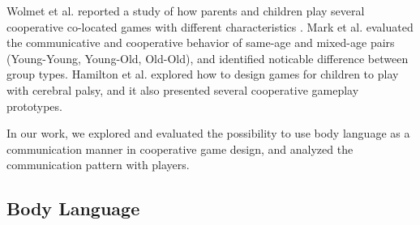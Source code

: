 Wolmet et al. reported a study of how parents and children play several cooperative co-located games with different characteristics \cite{CG5}. 
Mark et al. \cite{CG6} evaluated the communicative and cooperative behavior of same-age and mixed-age pairs (Young-Young, Young-Old, Old-Old), and identified noticable difference between group types. 
Hamilton et al. \cite{CG7} explored how to design games for children to play with cerebral palsy, and it also presented several cooperative gameplay prototypes.



In our work, we explored and evaluated the possibility to use body language as a communication manner in cooperative game design, and analyzed the communication pattern with players.

\subsection{Body Language}


